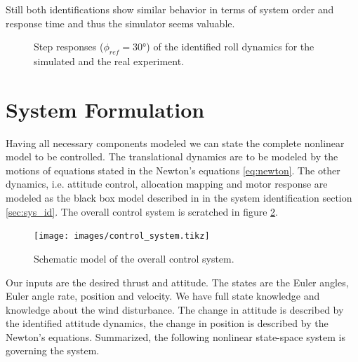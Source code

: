 Still both identifications show similar behavior in terms of system order and response time and thus the simulator seems valuable.
\begin{figure} 
\centering 
 
\caption{Step responses ($\phi_{ref} = 30 \si{\degree}$) of the identified roll dynamics for the simulated and the real experiment.} 
\label{fig:sys_id_step_response} 
\end{figure}

\section{System Formulation}
Having all necessary components modeled we can state the complete nonlinear model to be controlled. The translational dynamics are to be modeled by the motions of equations stated in the Newton's equations \ref{eq:newton}. The other dynamics, i.e. attitude control, allocation mapping and motor response are modeled as the black box model described in in the system identification section \ref{sec:sys_id}. The overall control system is scratched in figure \ref{pics:control_system}.

\begin{figure}
\centering
\texttt{[image: images/control\_system.tikz]}
\caption{Schematic model of the overall control system.}
\label{pics:control_system}
\end{figure}

Our inputs are the desired thrust and attitude. The states are the Euler angles, Euler angle rate, position and velocity. We have full state knowledge and knowledge about the wind disturbance. The change in attitude is described by the identified attitude dynamics, the change in position is described by the Newton's equations. Summarized, the following nonlinear state-space system is governing the system.


